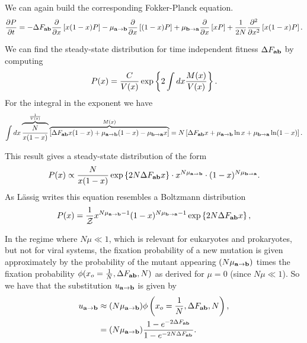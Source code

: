 We can again build the corresponding Fokker-Planck equation.
\begin{equation}
  {\partial P \over \partial t} =
  - \Delta F_{\mathbf{ab}} {\partial \over \partial x} \left[ x (1 - x) P \right] -
  \mu_{\mathbf{a} \rightarrow \mathbf{b}} {\partial \over \partial x} \left[ (1 - x) P \right] +
  \mu_{\mathbf{b} \rightarrow \mathbf{a}} {\partial \over \partial x} \left[ x P \right] +
  {1 \over 2N} {\partial^2 \over \partial x^2} \left[ x (1 - x) P \right].
\end{equation}

We can find the steady-state distribution for time independent fitness $\Delta F_{\mathbf{ab}}$ by
computing
\begin{equation}
  P(x) = {C \over V(x)} \exp\left\{ 2 \int dx {M(x) \over V(x)} \right\}.
\end{equation}
For the integral in the exponent we have
\begin{equation}
  \int dx \overbrace{{N \over x (1 - x)}}^{1 \over V(x)}
  \overbrace{\left[ \Delta F_{\mathbf{ab}} x ( 1 - x) + \mu_{\mathbf{a} \rightarrow \mathbf{b}} (1 - x) - \mu_{\mathbf{b} \rightarrow \mathbf{a}} x \right]}^
  {M(x)} =
  N \left[ \Delta F_{\mathbf{ab}} x + \mu_{\mathbf{a} \rightarrow \mathbf{b}} \ln x + \mu_{\mathbf{b} \rightarrow \mathbf{a}} \ln (1 - x) \right].
\end{equation}

This result gives a steady-state distribution of the form
\begin{equation}
  P(x) \propto {N \over x (1 - x)} \exp\left\{ 2 N \Delta F_{\mathbf{ab}} x \right\}
  \cdot x^{N \mu_{\mathbf{a} \rightarrow \mathbf{b}}} \cdot (1 - x)^{N \mu_{\mathbf{b} \rightarrow \mathbf{a}}}.
\end{equation}
As L\"{a}ssig writes this equation resembles a Boltzmann distribution
\begin{equation}
  P(x) = {1 \over \mathcal{Z}} x^{N \mu_{\mathbf{a} \rightarrow \mathbf{b}} - 1} (1 - x)^{N \mu_{\mathbf{b} \rightarrow \mathbf{a}} - 1}
  \exp \left\{ 2 N \Delta F_{\mathbf{ab}} x \right\},
\end{equation}

In the regime where $N \mu \ll 1$, which is relevant for eukaryotes and
prokaryotes, but not for viral systems, the fixation probability of a new
mutation is given approximately by the probability of the mutant appearing
$(N \mu_{\mathbf{a} \rightarrow \mathbf{b}})$ times the fixation probability $\phi(x_o = {1 \over N}, \Delta F_{\mathbf{ab}}, N)$
as derived for $\mu = 0$ (since $N \mu \ll 1$). So we have that the substitution
$u_{\mathbf{a} \rightarrow \mathbf{b}}$ is given by
\begin{align}
  u_{\mathbf{a} \rightarrow \mathbf{b}} &\approx (N \mu_{\mathbf{a} \rightarrow \mathbf{b}}) \phi\left( x_o = {1 \over N}, \Delta F_{\mathbf{ab}}, N \right),\\
  &= (N \mu_{\mathbf{a} \rightarrow \mathbf{b}}) {1 - e^{- 2 \Delta F_{\mathbf{ab}}} \over 1 - e^{- 2 N \Delta F_{\mathbf{ab}}}}.
\end{align}

